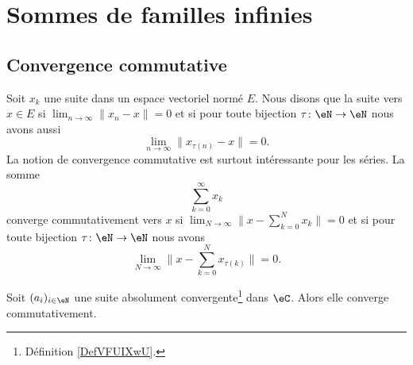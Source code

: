 \section{Sommes de familles infinies}
\label{SECooHHDXooUgLhHR}

\subsection{Convergence commutative}

\begin{definition}      \label{DEFooORAGooZslkyS}
	Soit \( x_k\) une suite dans un espace vectoriel normé \( E\). Nous disons que la suite  vers \( x\in E\) si \( \lim_{n\to \infty}\| x_n-x \| =0\) et si pour toute bijection \( \tau\colon \eN\to \eN\) nous avons aussi
	\begin{equation}
		\lim_{n\to \infty} \| x_{\tau(n)}-x \|=0.
	\end{equation}
	La notion de convergence commutative est surtout intéressante pour les séries. La somme
	\begin{equation}
		\sum_{k=0}^{\infty}x_k
	\end{equation}
	converge commutativement vers \( x\) si \( \lim_{N\to \infty} \| x-\sum_{k=0}^Nx_k \|=0\) et si pour toute bijection \( \tau\colon \eN\to \eN\) nous avons
	\begin{equation}
		\lim_{N\to \infty} \| x-\sum_{k=0}^Nx_{\tau(k)} \|=0.
	\end{equation}
\end{definition}

\begin{proposition} \label{PopriXWvIY}
	Soit \( (a_i)_{i\in \eN}\) une suite absolument convergente\footnote{Définition \ref{DefVFUIXwU}.} dans \( \eC\). Alors elle converge commutativement.
\end{proposition}

